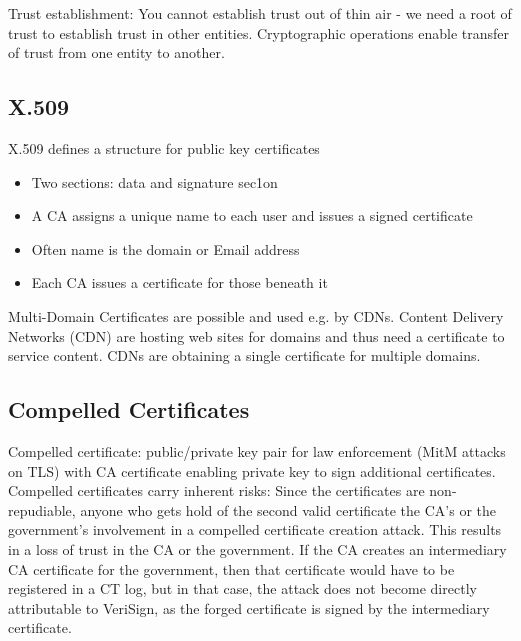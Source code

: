 \documentclass[11pt,oneside,a4paper]{article}
\begin{document}
Trust establishment: You cannot establish trust out of thin air - we need a root of trust to establish trust in other entities. Cryptographic operations enable transfer of trust from one entity to another.

\subsection{X.509}

X.509 defines a structure for public key certificates

\vspace{-\topsep}
\begin{itemize}
	\setlength{\itemsep}{0pt}
	\setlength{\parskip}{0pt}
	\item Two sections: data and signature sec1on
	\item A CA assigns a unique name to each user and issues a signed certificate
	\item Often name is the domain or Email address
	\item Each CA issues a certificate for those beneath it
\end{itemize}
\vspace{-\topsep}

Multi-Domain Certificates are possible and used e.g. by CDNs. Content Delivery Networks (CDN) are hosting web sites for domains and thus need a certificate to service content. CDNs are obtaining a single certificate for multiple domains.

\subsection{Compelled Certificates}

Compelled certificate: public/private key pair for law enforcement (MitM attacks on TLS) with CA certificate enabling private key to sign additional certificates. Compelled certificates carry inherent risks: Since the certificates are non-repudiable, anyone who gets hold of the second valid certificate the CA's or the government's involvement in a compelled certificate creation attack. This results in a loss of trust in the CA or the government. If the CA creates an intermediary CA certificate for the government, then that certificate would have to be registered in a CT log, but in that case, the attack
does not become directly attributable to VeriSign, as the forged certificate is signed by the intermediary certificate.

\newpage
\end{document}
